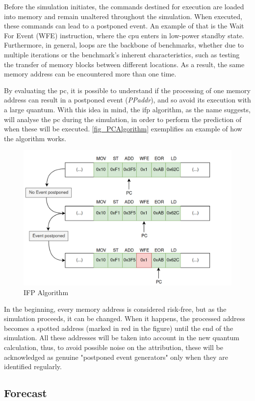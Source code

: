 Before the simulation initiates, the commands destined for execution are loaded into memory and remain unaltered throughout the simulation.  
When executed, these commands can lead to a postponed event. 
An example of that is the Wait For Event (WFE) instruction, where the \gls{cpu} enters in low-power 
standby state. Furthermore, in general, loops are the backbone of benchmarks, whether due to multiple iterations or the benchmark's inherent 
characteristics, such as testing the transfer of memory blocks between different locations. As a result, the same memory address can be 
encountered more than one time. 

By evaluating the \gls{pc}, it is possible to understand if the processing of one memory address can result in a postponed event (\textit{PPaddr}), 
and so avoid its execution with a large quantum. With this idea in mind, the \gls{ifp} algorithm, as the name suggests, will analyse the \gls{pc} during 
the simulation, in order to perform the prediction of when these will be executed. \autoref{fig_PCAlgorithm} exemplifies an example 
of how the algorithm works.

\begin{figure}[h!]
	\centering
 	\includegraphics[width=0.7\linewidth]{Images/PCAlgorithm.png}
 	\caption{IFP Algorithm}
	 \label{fig_PCAlgorithm}
\end{figure}

In the beginning, every memory address is considered risk-free, but as the simulation proceeds, it can be changed. When it happens, the processed 
address becomes a spotted address (marked in red in the figure) until the end of the simulation. All these addresses will be taken into 
account in the new quantum calculation, thus, to avoid possible noise on the attribution, these will be acknowledged as genuine 
"postponed event generators" only when they are identified regularly.

 
\subsection{Forecast}

